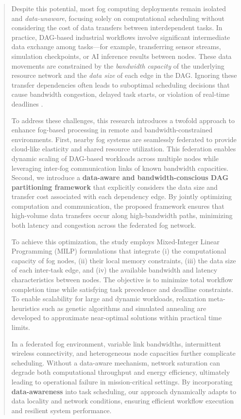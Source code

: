\documentclass[conference]{IEEEtran}
\begin{document}
\begin{abstract}
Despite this potential, most fog computing deployments remain isolated and \textit{data-unaware}, focusing solely on computational scheduling without considering the cost of data transfers between interdependent tasks. In practice, DAG-based industrial workflows involve significant intermediate data exchange among tasks---for example, transferring sensor streams, simulation checkpoints, or AI inference results between nodes. These data movements are constrained by the \textit{bandwidth capacity} of the underlying resource network and the \textit{data size} of each edge in the DAG. Ignoring these transfer dependencies often leads to suboptimal scheduling decisions that cause bandwidth congestion, delayed task starts, or violation of real-time deadlines \cite{salehi2016robust}.

To address these challenges, this research introduces a twofold approach to enhance fog-based processing in remote and bandwidth-constrained environments. First, nearby fog systems are seamlessly federated to provide cloud-like elasticity and shared resource utilization. This federation enables dynamic scaling of DAG-based workloads across multiple nodes while leveraging inter-fog communication links of known bandwidth capacities. Second, we introduce a \textbf{data-aware and bandwidth-conscious DAG partitioning framework} that explicitly considers the data size and transfer cost associated with each dependency edge. By jointly optimizing computation and communication, the proposed framework ensures that high-volume data transfers occur along high-bandwidth paths, minimizing both latency and congestion across the federated fog network.

To achieve this optimization, the study employs Mixed-Integer Linear Programming (MILP) formulations that integrate (i) the computational capacity of fog nodes, (ii) their local memory constraints, (iii) the data size of each inter-task edge, and (iv) the available bandwidth and latency characteristics between nodes. The objective is to minimize total workflow completion time while satisfying task precedence and deadline constraints. To enable scalability for large and dynamic workloads, relaxation meta-heuristics such as genetic algorithms and simulated annealing are developed to approximate near-optimal solutions within practical time limits.

In a federated fog environment, variable link bandwidths, intermittent wireless connectivity, and heterogeneous node capacities further complicate scheduling. Without a data-aware mechanism, network saturation can degrade both computational throughput and energy efficiency, ultimately leading to operational failure in mission-critical settings. By incorporating \textbf{data-awareness} into task scheduling, our approach dynamically adapts to data locality and network conditions, ensuring efficient workflow execution and resilient system performance.


\end{abstract}
\end{document}
